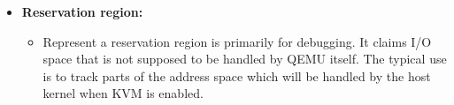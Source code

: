\begin{itemize}
    \item \textbf{Reservation region:} 
        \begin{itemize}
            \item Represent a reservation region is primarily for debugging. It claims I/O space that is not supposed to be handled by QEMU itself. The typical use is to track parts of the address space which will be handled by the host kernel when KVM is enabled.
        \end{itemize}
\end{itemize}